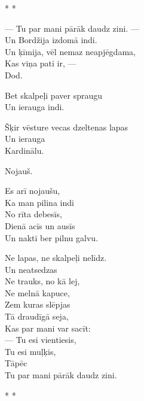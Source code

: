 \documentclass[14pt]{extarticle}
\begin{document}
\newpage

{\large \sc * * *} 

--- Tu par mani pārāk daudz zini. ---\\
Un Bordžija izdomā indi.\\
Un ķīmija, vēl nemaz neapjēgdama,\\
Kas viņa pati ir, ---\\
Dod.

Bet skalpeļi paver spraugu\\
Un ierauga indi.

Šķir vēsture vecas dzeltenas lapas\\
Un ierauga\\
Kardinālu.

Nojauš.

Es arī nojaušu,\\
Ka man pilina indi\\
No rīta debesīs,\\
Dienā acīs un ausīs\\
Un naktī ber pilnu galvu.

Ne lapas, ne skalpeļi nelīdz.\\
Un neatsedzas\\
Ne trauks, no kā lej,\\
Ne melnā kapuce,\\
Zem kuras slēpjas\\
Tā draudīgā seja,\\
Kas par mani var sacīt:\\
--- Tu esi vientiesis,\\
Tu esi muļķis,\\
Tāpēc\\
Tu par mani pārāk daudz zini.


\newpage

{\large \sc * * *}
\end{document}
